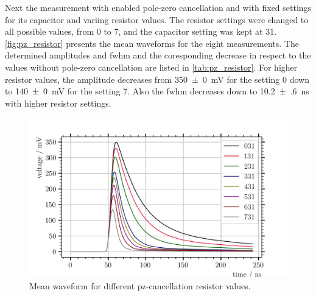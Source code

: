 Next the measurement with enabled pole-zero cancellation and with fixed settings for its capacitor and variing resistor values.
The resistor settings were changed to all possible values, from 0 to 7, and the capacitor setting was kept at 31.
\autoref{fig:pz_resistor} presents the mean waveforms for the eight measurements.
The determined amplitudes and \ac{fwhm} and the coresponding decrease in respect to the values without pole-zero cancellation are listed in \autoref{tab:pz_resistor}.
For higher resistor values, the amplitude decreases from \SI{350(0)}{\milli\volt} for the setting 0 down to \SI{140(0)}{\milli\volt} for the setting 7.
Also the \ac{fwhm} decreases down to \SI{10.2(6)}{\nano\second} with higher resistor settings.



\begin{figure}
	\centering
	\includegraphics[width=1.\textwidth]{pictures/pz_resistor}
	\caption[Mean waveform for different pz-cancellation resistor values.]{Mean waveform for different pz-cancellation resistor values.}
	\label{fig:pz_resistor}
\end{figure}

